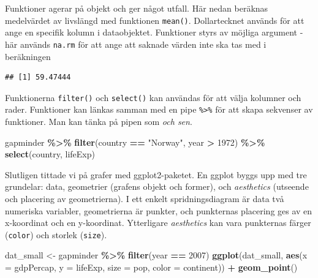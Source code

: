 \documentclass[
]{book}
\newenvironment{Shaded}{\begin{snugshade}}{\end{snugshade}}
\newcommand{\AttributeTok}[1]{\textcolor[rgb]{0.13,0.29,0.53}{#1}}
\newcommand{\CommentTok}[1]{\textcolor[rgb]{0.56,0.35,0.01}{\textit{#1}}}
\newcommand{\DecValTok}[1]{\textcolor[rgb]{0.00,0.00,0.81}{#1}}
\newcommand{\FunctionTok}[1]{\textcolor[rgb]{0.13,0.29,0.53}{\textbf{#1}}}
\newcommand{\NormalTok}[1]{#1}
\newcommand{\OtherTok}[1]{\textcolor[rgb]{0.56,0.35,0.01}{#1}}
\newcommand{\SpecialCharTok}[1]{\textcolor[rgb]{0.81,0.36,0.00}{\textbf{#1}}}
\newcommand{\StringTok}[1]{\textcolor[rgb]{0.31,0.60,0.02}{#1}}
\theoremstyle{definition}
\theoremstyle{definition}
\theoremstyle{definition}
\theoremstyle{definition}
\theoremstyle{remark}
\begin{document}
Funktioner agerar på objekt och ger något utfall. Här nedan beräknas medelvärdet av livslängd med funktionen \texttt{mean()}. Dollartecknet används för att ange en specifik kolumn i dataobjektet. Funktioner styrs av möjliga argument - här används \texttt{na.rm} för att ange att saknade värden inte ska tas med i beräkningen

\begin{Shaded}
\end{Shaded}

\begin{verbatim}
## [1] 59.47444
\end{verbatim}

Funktionerna \texttt{filter()} och \texttt{select()} kan användas för att välja kolumner och rader. Funktioner kan länkas samman med en pipe \texttt{\%\textgreater{}\%} för att skapa sekvenser av funktioner. Man kan tänka på pipen som \emph{och sen}.

\begin{Shaded}
\begin{Highlighting}[]
\NormalTok{gapminder }\SpecialCharTok{\%\textgreater{}\%}
  \FunctionTok{filter}\NormalTok{(country }\SpecialCharTok{==} \StringTok{"Norway"}\NormalTok{, year }\SpecialCharTok{\textgreater{}} \DecValTok{1972}\NormalTok{) }\SpecialCharTok{\%\textgreater{}\%}
  \FunctionTok{select}\NormalTok{(country, lifeExp)}
\end{Highlighting}
\end{Shaded}

Slutligen tittade vi på grafer med ggplot2-paketet. En ggplot byggs upp med tre grundelar: data, geometrier (grafens objekt och former), och \emph{aesthetics} (utseende och placering av geometrierna). I ett enkelt spridningsdiagram är data två numeriska variabler, geometrierna är punkter, och punkternas placering ges av en x-koordinat och en y-koordinat. Ytterligare \emph{aesthetics} kan vara punkternas färger (\texttt{color}) och storlek (\texttt{size}).

\begin{Shaded}
\begin{Highlighting}[]
\NormalTok{dat\_small }\OtherTok{\textless{}{-}}\NormalTok{ gapminder }\SpecialCharTok{\%\textgreater{}\%} \FunctionTok{filter}\NormalTok{(year }\SpecialCharTok{==} \DecValTok{2007}\NormalTok{)}
\FunctionTok{ggplot}\NormalTok{(dat\_small, }\FunctionTok{aes}\NormalTok{(}\AttributeTok{x =}\NormalTok{ gdpPercap, }\AttributeTok{y =}\NormalTok{ lifeExp, }
                      \AttributeTok{size =}\NormalTok{ pop, }\AttributeTok{color =}\NormalTok{ continent)) }\SpecialCharTok{+}
  \FunctionTok{geom\_point}\NormalTok{()}
\end{Highlighting}
\end{Shaded}
\end{document}
